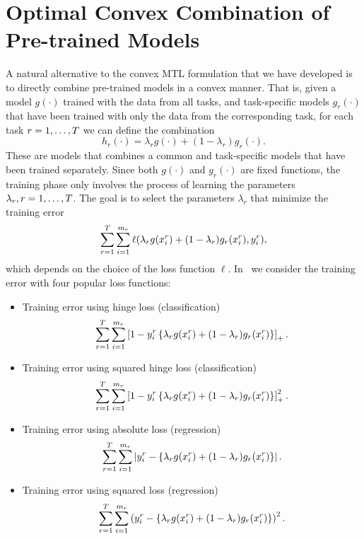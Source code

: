 \section{Optimal Convex Combination of Pre-trained Models}
A natural alternative to the convex MTL formulation that we have developed is to directly combine pre-trained models in a convex manner. That is, given a model $g(\cdot)$ trained with the data from all tasks, and task-specific models $g_r(\cdot)$ that have been trained with only the data from the corresponding task, for each task $r=1,\ldots,T$ we can define the combination
\begin{equation}
    \nonumber
    h_r(\cdot) = \lambda_r g(\cdot) + (1 - \lambda_r) g_r(\cdot) .
\end{equation}
These are models that combines a common and task-specific models that have been trained separately. Since both $g(\cdot)$ and $g_r(\cdot)$ are fixed functions, the training phase only involves the process of learning the parameters $\lambda_r, r=1, \ldots, T$. The goal is to select the parameters $\lambda_r$ that minimize the training error
\begin{equation}
    \nonumber
    \sum_{r=1}^T \sum_{i=1}^{m_r} \ell(\lambda_r g(x_i^r) + (1 - \lambda_r) g_r(x_i^r), y_i^r) ,
\end{equation}
which depends on the choice of the loss function $\ell$. 
In~\cite{RuizAD21} we consider the training error with four popular loss functions:
\begin{itemize}
    \item Training error using hinge loss (classification)
    \begin{equation}
        \nonumber
        \sum_{r=1}^T \sum_{i=1}^{m_r} \left[1 - y_i^r \left\lbrace\lambda_r g(x_i^r) + (1 - \lambda_r) g_r(x_i^r) \right \rbrace\right]_{+} .
    \end{equation}
    \item Training error using squared hinge loss (classification)
    \begin{equation}
        \nonumber
        \sum_{r=1}^T \sum_{i=1}^{m_r} \left[1 - y_i^r \left\lbrace\lambda_r g(x_i^r) + (1 - \lambda_r) g_r(x_i^r) \right \rbrace\right]_{+}^2 .
    \end{equation}
    \item Training error using absolute loss (regression)
    \begin{equation}
        \nonumber
        \sum_{r=1}^T \sum_{i=1}^{m_r} \left|y_i^r - \left\lbrace\lambda_r g(x_i^r) + (1 - \lambda_r) g_r(x_i^r) \right \rbrace\right| .
    \end{equation}
    \item Training error using squared loss (regression)
    \begin{equation}
        \nonumber
        \sum_{r=1}^T \sum_{i=1}^{m_r} \left( {y_i^r - \left\lbrace\lambda_r g(x_i^r) + (1 - \lambda_r) g_r(x_i^r) \right \rbrace} \right)^2 .
    \end{equation}
\end{itemize}
